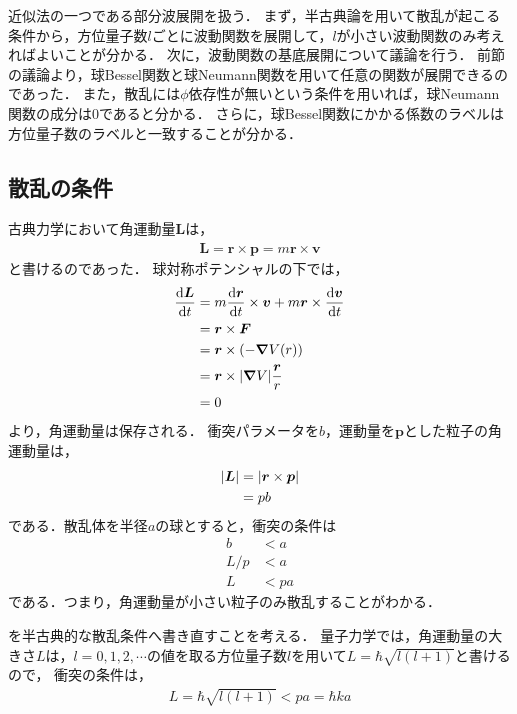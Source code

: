 \documentclass{report}
\begin{document}
  近似法の一つである部分波展開を扱う．
  まず，半古典論を用いて散乱が起こる条件から，方位量子数$l$ごとに波動関数を展開して，$l$が小さい波動関数のみ考えればよいことが分かる．
  次に，波動関数の基底展開について議論を行う．
  前節の議論より，球Bessel関数と球Neumann関数を用いて任意の関数が展開できるのであった．
  また，散乱には$\phi$依存性が無いという条件を用いれば，球Neumann関数の成分は0であると分かる．
  さらに，球Bessel関数にかかる係数のラベルは方位量子数のラベルと一致することが分かる．
  \subsection{散乱の条件}
    古典力学において角運動量$\bm{L}$は，
    \begin{align}
      \bm{L} = \bm{r} \times \bm{p} = m\bm{r} \times \bm{v}
    \end{align}
    と書けるのであった．
    球対称ポテンシャルの下では，
    \begin{align}
      \dv{\bm{L}}{t} &= m\dv{\bm{r}}{t} \times \bm{v} + m\bm{r} \times \dv{\bm{v}}{t} \\
      &= \bm{r} \times \bm{F} \\
      &= \bm{r} \times (-\grad V(r)) \\
      &= \bm{r} \times \abs{\grad V}\frac{\bm{r}}{r} \\
      &= 0
    \end{align}
    より，角運動量は保存される．
    衝突パラメータを$b$，運動量を$\bm{p}$とした粒子の角運動量は，
    \begin{align}
      \abs{\bm{L}} &= \abs{\bm{r} \times \bm{p}} \\
      &= pb
    \end{align}
    である．散乱体を半径$a$の球とすると，衝突の条件は
    \begin{align}
      b &< a \\
      L/p &< a \\
      L &< pa \label{ConditionofSC}
    \end{align}
    である．つまり，角運動量が小さい粒子のみ散乱することがわかる．
    \par
    を半古典的な散乱条件へ書き直すことを考える．
    量子力学では，角運動量の大きさ$L$は，$l = 0, 1, 2, \cdots$の値を取る方位量子数$l$を用いて$L = \hbar \sqrt{l(l + 1)}$と書けるので，
    衝突の条件は，
    \begin{align}
      L = \hbar \sqrt{l(l + 1)} < pa = \hbar ka\label{scattering-condition-of-l}
    \end{align}
\end{document}

